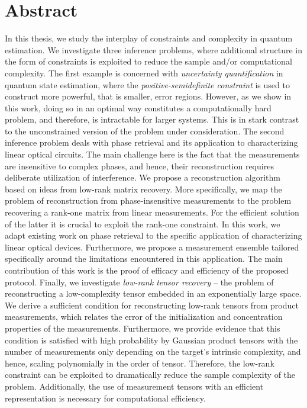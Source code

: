 \documentclass[
  a4paper,
  11pt,
  BCOR=8mm,
  twoside,
  headsepline]{scrbook}
\begin{document}
\chapter*{Abstract}
\setcounter{page}{3}

In this thesis, we study the interplay of constraints and complexity in quantum estimation.
We investigate three inference problems, where additional structure in the form of constraints is exploited to reduce the sample and/or computational complexity.
The first example is concerned with \emph{uncertainty quantification} in quantum state estimation, where the \emph{positive-semidefinite constraint} is used to construct more powerful, that is smaller, error regions.
However, as we show in this work, doing so in an optimal way constitutes a computationally hard problem, and therefore, is intractable for larger systems.
This is in stark contrast to the unconstrained version of the problem under consideration.
The second inference problem deals with phase retrieval and its application to characterizing linear optical circuits.
The main challenge here is the fact that the measurements are insensitive to complex phases, and hence, their reconstruction requires deliberate utilization of interference.
We propose a reconstruction algorithm based on ideas from low-rank matrix recovery.
More specifically, we map the problem of reconstruction from phase-insensitive measurements to the problem recovering a rank-one matrix from linear measurements.
For the efficient solution of the latter it is crucial to exploit the rank-one constraint.
In this work, we adapt existing work on phase retrieval to the specific application of characterizing linear optical devices.
Furthermore, we propose a measurement ensemble tailored specifically around the limitations encountered in this application.
The main contribution of this work is the proof of efficacy and efficiency of the proposed protocol.
Finally, we investigate \emph{low-rank tensor recovery} -- the problem of reconstructing a low-complexity tensor embedded in an exponentially large space.
We derive a sufficient condition for reconstructing low-rank tensors from product measurements, which relates the error of the initialization and concentration properties of the measurements.
Furthermore, we provide evidence that this condition is satisfied with high probability by Gaussian product tensors with the number of measurements only depending on the target's intrinsic complexity, and hence, scaling polynomially in the order of tensor.
Therefore, the low-rank constraint can be exploited to dramatically reduce the sample complexity of the problem.
Additionally, the use of measurement tensors with an efficient representation is necessary for computational efficiency.
\end{document}
